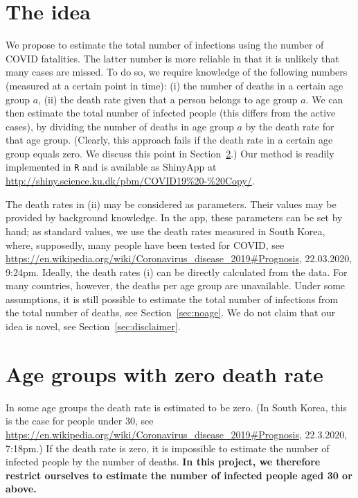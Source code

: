 \documentclass[a4paper]{article}
\newcommand\todo[1]{{\color{red}todo: #1}}
\begin{document}
\section{The idea}
We propose to estimate the total number of infections using the 
number of COVID fatalities. The latter number is more reliable in 
that it is unlikely that many cases are missed. To do so, 
we require knowledge of the following numbers (measured at a certain point in time):
(i) the number of deaths in a certain age group $a$,
(ii) the death rate given that a person belongs to age group $a$.
We can then estimate the total number of infected people 
(this differs from the active cases),
by dividing the number of deaths in age group $a$ by the death rate for that age group. (Clearly, this approach fails if the death rate in a certain age group equals zero. We discuss this point in Section~\ref{sec:zerodeathrate}.)
Our method is readily implemented in \Verb+R+ and is available as ShinyApp
at \url{http://shiny.science.ku.dk/pbm/COVID19%20-%20Copy/}.

The death rates in (ii) may be considered as parameters.
Their values may be provided by
background knowledge. 
In the app,
these parameters can be set by hand;
as standard values, we use the death rates 
measured in South Korea, 
where, supposedly, many people have been tested for COVID,
see
\url{https://en.wikipedia.org/wiki/Coronavirus_disease_2019#Prognosis}, 22.03.2020, 9:24pm.
Ideally, the death rates (i) can be directly calculated from the data. 
For many countries, however, the deaths per age group are unavailable. 
Under some assumptions, it is still possible to estimate the total number of infections
from the total number of deaths, see Section~\ref{sec:noage}.
We do not claim that our idea is novel, see Section~\ref{sec:disclaimer}.



\section{Age groups with zero death rate} \label{sec:zerodeathrate}
In some age groups the death rate is estimated to be zero.
(In South Korea, this is the case for people under 30,
see \url{https://en.wikipedia.org/wiki/Coronavirus_disease_2019#Prognosis}, 22.3.2020, 7:18pm.)
If the death rate is zero, it is impossible 
to estimate the number of infected people by the number of deaths.
{\bf In this project, we therefore restrict ourselves to estimate the number
of infected people aged 30 or above.}
\end{document}
